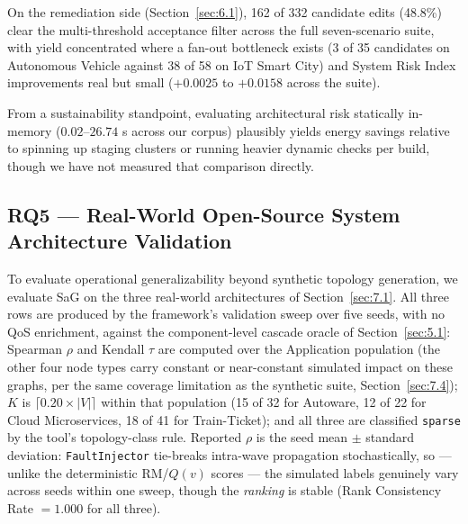 On the remediation side (Section~\ref{sec:6.1}), 162 of 332 candidate edits (48.8\%) clear the
multi-threshold acceptance filter across the full seven-scenario suite, with yield concentrated where
a fan-out bottleneck exists (3 of 35 candidates on Autonomous Vehicle against 38 of 58 on IoT Smart
City) and System Risk Index improvements real but small (\(+0.0025\) to \(+0.0158\) across the
suite).

From a sustainability standpoint, evaluating architectural risk statically in-memory
(\(0.02\)--\(26.74\) s across our corpus) plausibly yields energy savings relative to spinning up
staging clusters or running heavier dynamic checks per build, though we have not measured that
comparison directly.

\hypertarget{rq5-real-world-open-source-system-architecture-validation}{%
\subsection{RQ5 --- Real-World Open-Source System Architecture Validation}\label{rq5-real-world-open-source-system-architecture-validation}}

\label{sec:8.5}

To evaluate operational generalizability beyond synthetic topology generation, we evaluate SaG on the
three real-world architectures of Section~\ref{sec:7.1}. All three rows are produced by the
framework's validation sweep over five seeds, with no QoS enrichment, against the component-level
cascade oracle of Section~\ref{sec:5.1}: Spearman \(\rho\) and Kendall \(\tau\) are computed over the
Application population (the other four node types carry constant or near-constant simulated impact on
these graphs, per the same coverage limitation as the synthetic suite, Section~\ref{sec:7.4}); \(K\)
is \(\lceil 0.20 \times |V| \rceil\) within that population (15 of 32 for Autoware, 12 of 22 for
Cloud Microservices, 18 of 41 for Train-Ticket); and all three are classified \texttt{sparse} by the
tool's topology-class rule. Reported \(\rho\) is the seed mean \(\pm\) standard deviation:
\texttt{FaultInjector} tie-breaks intra-wave propagation stochastically, so --- unlike the
deterministic RM/\(Q(v)\) scores --- the simulated labels genuinely vary across seeds within one
sweep, though the \emph{ranking} is stable (Rank Consistency Rate \(=1.000\) for all three).

